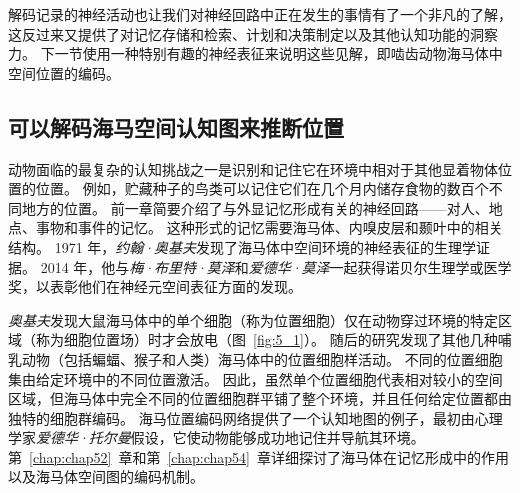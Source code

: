 解码记录的神经活动也让我们对神经回路中正在发生的事情有了一个非凡的了解，这反过来又提供了对记忆存储和检索、计划和决策制定以及其他认知功能的洞察力。
下一节使用一种特别有趣的神经表征来说明这些见解，即啮齿动物海马体中空间位置的编码。


\subsection{可以解码海马空间认知图来推断位置}

动物面临的最复杂的认知挑战之一是识别和记住它在环境中相对于其他显着物体位置的位置。
例如，贮藏种子的鸟类可以记住它们在几个月内储存食物的数百个不同地方的位置。
前一章简要介绍了与外显记忆形成有关的神经回路——对人、地点、事物和事件的记忆。
这种形式的记忆需要海马体、内嗅皮层和颞叶中的相关结构。
1971 年，\textit{约翰·奥基夫}发现了海马体中空间环境的神经表征的生理学证据。
2014 年，他与\textit{梅·布里特·莫泽}和\textit{爱德华·莫泽}一起获得诺贝尔生理学或医学奖，以表彰他们在神经元空间表征方面的发现。


\textit{奥基夫}发现大鼠海马体中的单个细胞（称为位置细胞）仅在动物穿过环境的特定区域（称为细胞位置场）时才会放电（图~\ref{fig:5_1}）。
随后的研究发现了其他几种哺乳动物（包括蝙蝠、猴子和人类）海马体中的位置细胞样活动。
不同的位置细胞集由给定环境中的不同位置激活。
因此，虽然单个位置细胞代表相对较小的空间区域，但海马体中完全不同的位置细胞群平铺了整个环境，并且任何给定位置都由独特的细胞群编码。
海马位置编码网络提供了一个认知地图的例子，最初由心理学家\textit{爱德华·托尔曼}假设，它使动物能够成功地记住并导航其环境。
第~\ref{chap:chap52}~章和第~\ref{chap:chap54}~章详细探讨了海马体在记忆形成中的作用以及海马体空间图的编码机制。



